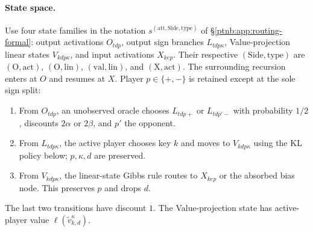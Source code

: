 \paragraph{State space.}\label{ptnb:app:attention-state-space}
Use four state families in the notation $s^{(\mathrm{att},\mathrm{Side},\mathrm{type})}$ of \S\ref{ptnb:app:routing-formal}: output activations $O_{tdp}$, output sign branches $L_{tdp\kappa}$, Value-projection linear states $V_{kdp\kappa}$, and input activations $X_{kep}$. Their respective $(\mathrm{Side},\mathrm{type})$ are $(\mathrm O,\mathrm{act})$, $(\mathrm O,\mathrm{lin})$, $(\mathrm{val},\mathrm{lin})$, and $(\mathrm X,\mathrm{act})$. The surrounding recursion enters at $O$ and resumes at $X$. Player $p\in\{+,-\}$ is retained except at the sole sign split:
\begin{enumerate}
    \item From $O_{tdp}$, an unobserved oracle chooses $L_{tdp+}$ or $L_{tdp'-}$ with probability $1/2$, discounts $2\alpha$ or $2\beta$, and $p'$ the opponent.
    \item From $L_{tdp\kappa}$, the active player chooses key $k$ and moves to $V_{kdp\kappa}$ using the KL policy below; $p,\kappa,d$ are preserved.
    \item From $V_{kdp\kappa}$, the linear-state Gibbs rule routes to $X_{kep}$ or the absorbed bias node. This preserves $p$ and drops $d$.
\end{enumerate}
The last two transitions have discount $1$. The Value-projection state has active-player value $\ell(\tilde v_{k,d}^\kappa)$.

